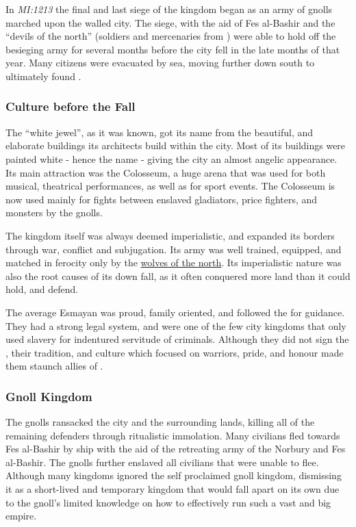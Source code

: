 In \emph{MI:1213} the final and last siege of the kingdom began as an army of
gnolls marched upon the walled city. The siege, with the aid of Fes al-Bashir
and the ``devils of the north'' (soldiers and mercenaries from
) were able to hold off the besieging army for several
months before the city fell in the late months of that year. Many citizens
were evacuated by sea, moving further down south to ultimately found
.

\subsubsection{Culture before the Fall}

The ``white jewel'', as it was known, got its name from the beautiful, and
elaborate buildings its architects build within the city. Most of its
buildings were painted white - hence the name - giving the city an almost
angelic appearance. Its main attraction was the Colosseum, a huge arena
that was used for both musical, theatrical performances, as well as for
sport events. The Colosseum is now used mainly for fights between enslaved
gladiators, price fighters, and monsters by the gnolls.

The kingdom itself was always deemed imperialistic, and expanded its borders
through war, conflict and subjugation. Its army was well trained, equipped,
and matched in ferocity only by the \hyperref[sec:Norbury]{wolves of the
  north}. Its imperialistic nature was also the root causes of its down fall,
as it often conquered more land than it could hold, and defend.

The average Esmayan was proud, family oriented, and followed the
 for guidance. They had a strong legal system, and were one
of the few city kingdoms that only used slavery for indentured servitude of
criminals. Although they did not sign the , their
tradition, and culture which focused on warriors, pride, and honour made them
staunch allies of .

\subsubsection{Gnoll Kingdom}

The gnolls ransacked the city and the surrounding lands, killing all of the
remaining defenders through ritualistic immolation. Many civilians fled
towards Fes al-Bashir by ship with the aid of the retreating army of the
Norbury and Fes al-Bashir. The gnolls further enslaved all civilians that were
unable to flee. Although many kingdoms ignored the self proclaimed gnoll
kingdom, dismissing it as a short-lived and temporary kingdom that would fall
apart on its own due to the gnoll's limited knowledge on how to effectively
run such a vast and big empire.

